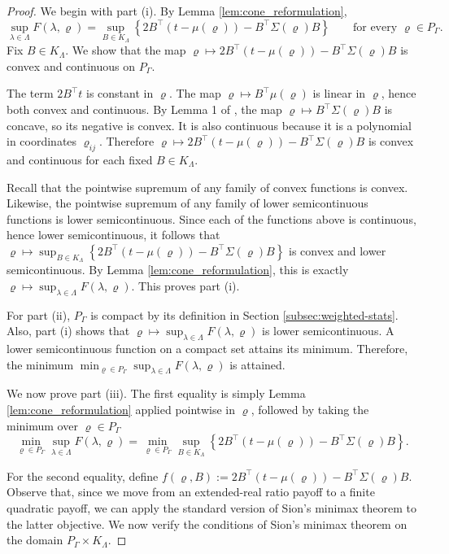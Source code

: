 \documentclass[12pt,leqno,titlepage]{amsart}
\newcommand{\1}{\mathbbm{1}}
\begin{document}
\begin{bibunit}
\begin{proof}
We begin with part (i). By Lemma \ref{lem:cone_reformulation},
\[
\sup_{\lambda\in\Lambda}F(\lambda,\varrho)
=
\sup_{B\in K_\Lambda}
\left\{
2B^\top(t-\mu(\varrho))-B^\top\Sigma(\varrho)B
\right\}
\qquad\text{for every } \varrho\in P_\Gamma.
\]
Fix $B\in K_\Lambda$. We show that the map
$
\varrho\longmapsto 2B^\top(t-\mu(\varrho))-B^\top\Sigma(\varrho)B
$
is convex and continuous on $P_\Gamma$.

The term $2B^\top t$ is constant in $\varrho$. The map
$\varrho\mapsto B^\top\mu(\varrho)$ is linear in $\varrho$, hence both convex
and continuous. By Lemma 1 of \cite{cohen2020multivariate}, the
map $\varrho\mapsto B^\top\Sigma(\varrho)B$ is concave, so its negative is
convex. It is also continuous because it is a polynomial in coordinates
$\varrho_{ij}$. Therefore
$
\varrho\longmapsto 2B^\top(t-\mu(\varrho))-B^\top\Sigma(\varrho)B
$
is convex and continuous for each fixed $B\in K_\Lambda$.

Recall that the pointwise supremum of any family of convex functions is convex. Likewise, the
pointwise supremum of any family of lower semicontinuous functions is lower
semicontinuous. Since each of the functions above is continuous, hence lower
semicontinuous, it follows that
$
\varrho\longmapsto \sup_{B\in K_\Lambda}
\left\{
2B^\top(t-\mu(\varrho))-B^\top\Sigma(\varrho)B
\right\}
$
is convex and lower semicontinuous. By Lemma
\ref{lem:cone_reformulation}, this is exactly
$
\varrho\longmapsto \sup_{\lambda\in\Lambda}F(\lambda,\varrho).
$
This proves part (i).

For part (ii), $P_\Gamma$ is compact by its definition in Section \ref{subsec:weighted-stats}. Also,  part (i) shows that
$
\varrho\longmapsto \sup_{\lambda\in\Lambda}F(\lambda,\varrho)
$
is lower semicontinuous. A lower semicontinuous function on a compact set
attains its minimum. Therefore, the minimum
$
\min_{\varrho\in P_\Gamma}\sup_{\lambda\in\Lambda}F(\lambda,\varrho)
$
is attained.

We now prove part (iii). The first equality is simply Lemma
\ref{lem:cone_reformulation} applied pointwise in $\varrho$, followed by taking
the minimum over $\varrho\in P_\Gamma$
\[
\min_{\varrho\in P_\Gamma}\sup_{\lambda\in\Lambda}F(\lambda,\varrho)
=
\min_{\varrho\in P_\Gamma}\sup_{B\in K_\Lambda}
\left\{
2B^\top(t-\mu(\varrho))-B^\top\Sigma(\varrho)B
\right\}.
\]

For the second equality, define
$
f(\varrho,B)
:=
2B^\top(t-\mu(\varrho))-B^\top\Sigma(\varrho)B.
$
Observe that, since we move from an extended-real ratio payoff to a finite
quadratic payoff, we can apply the standard version of Sion's minimax theorem
to the latter objective. We now verify the conditions of Sion's minimax theorem
on the domain $P_\Gamma \times K_\Lambda$.


\end{proof}
\end{bibunit}
\end{document}
